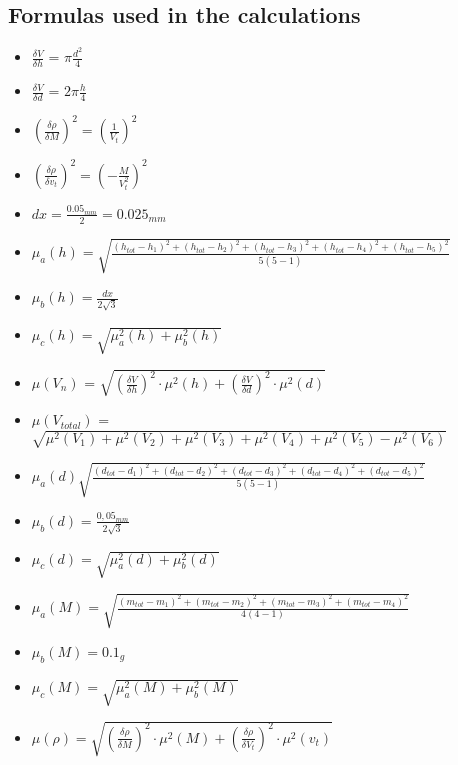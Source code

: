 \subsection*{Formulas used in the calculations}
\begin{itemize}
\item $\frac{\delta V}{\delta h}$ = $\pi\frac{d^2}{4}$
\item $\frac{\delta V}{\delta d}$ = $2\pi\frac{h}{4}$
\item $(\frac{\delta\rho}{\delta{M}})^2 = (\frac{1}{V_t})^2$
\item $(\frac{\delta\rho}{\delta{v_t}})^2 = (-\frac{M}{V_t^2})^2$
\item $dx = \frac{0.05_{mm}}{2} = 0.025_{mm}$
\item $\mu_a(h) = \sqrt{\frac{(h_{tot} - h_1)^2 + (h_{tot} - h_2)^2 + (h_{tot} - h_3)^2 + (h_{tot} - h_4)^2 + (h_{tot} - h_5)^2}{5(5-1)}}$
\item $\mu_b(h) = \frac{dx}{2\sqrt3}$
\item $\mu_c(h) = \sqrt{\mu_a^2(h) + \mu_b^2(h)}$
\item $\mu (V_n)$ = $\sqrt{(\frac{\delta V}{\delta h})^2 \cdot \mu^2(h) + (\frac{\delta V}{\delta d})^2 \cdot \mu^2 (d)}$
\item $\mu (V_{total})$ = $\sqrt{ \mu^2(V_1) + \mu^2 (V_2) + \mu^2(V_3) + \mu^2(V_4) + \mu^2(V_5) - \mu^2(V_6)}$
\item $\mu_a(d) \sqrt{\frac{(d_{tot} - d_1)^2 + (d_{tot} - d_2)^2 + (d_{tot} - d_3)^2 + (d_{tot} - d_4)^2 + (d_{tot} - d_5)^2}{5(5-1)}}$ 
\item $\mu_{b}(d) = \frac{0,05_{mm}}{2\sqrt{3}}$
\item $\mu_c(d) = \sqrt{\mu_a^2(d) + \mu_b^2(d)}$
\item $\mu_a (M) = \sqrt{\frac{(m_{tot} - m_1)^2 + (m_{tot} - m_2)^2 + (m_{tot} - m_3)^2 + (m_{tot} - m_4)^2}{4(4-1)}}$
\item $\mu_b (M) = 0.1_g$
\item $\mu_c(M) = \sqrt{\mu_a^2(M) + \mu_b^2(M)}$
\item $\mu(\rho) = \sqrt{(\frac{\delta\rho}{\delta{M}})^2 \cdot \mu^2(M) +(\frac{\delta\rho}{\delta{V_t}})^2 \cdot\mu^2(v_t)}$
\end{itemize}




